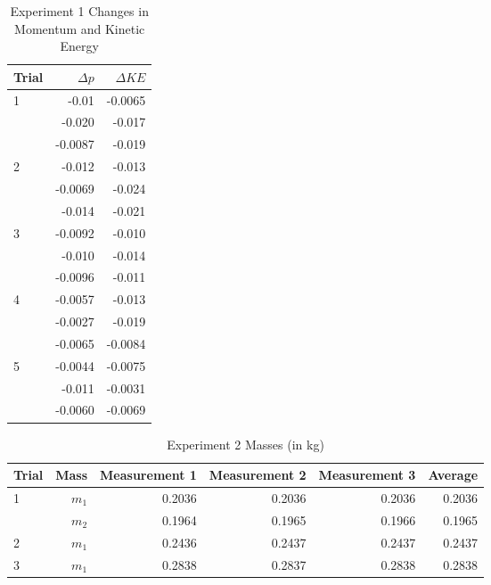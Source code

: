 \documentclass [12pt, letterpaper, twoside] {article}
\begin{document}
\begin {table}[h]
  \centering
  \begin {tabular} {| l | r | r |}
    \hline\hline
    Trial & \(\Delta{p}\) & \(\Delta{KE}\) \\
    \hline
    \multirow {3}{*}{1} & -0.01 & -0.0065 \\ %
    & -0.020 & -0.017 \\ %
    & -0.0087 & -0.019 \\ %
    \hline
    \multirow {3}{*}{2} & -0.012 & -0.013 \\ %
    & -0.0069 & -0.024 \\ %
    & -0.014 & -0.021 \\ %
    \hline
    \multirow {3}{*}{3} & -0.0092 & -0.010 \\ %
    & -0.010 & -0.014 \\ %
    & -0.0096 & -0.011 \\ %
    \hline
    \multirow {3}{*}{4} & -0.0057 & -0.013 \\ %
    & -0.0027 & -0.019 \\ %
    & -0.0065 & -0.0084 \\ %
    \hline
    \multirow {3}{*}{5} & -0.0044 & -0.0075 \\ %
    & -0.011 & -0.0031 \\ %
    & -0.0060 & -0.0069 \\ %
    \hline\hline
  \end {tabular}
  \caption {Experiment 1 Changes in Momentum and Kinetic Energy}
\end {table}

\begin {table}[h]
  \centering
  \begin {tabular} {| l | r | r | r | r | r |}
    \hline\hline
    Trial & Mass & Measurement 1 & Measurement 2 & Measurement 3 & Average \\
    \hline
    \multirow {2}{*}{1} & \(m_{1}\) & 0.2036 & 0.2036 & 0.2036 & 0.2036 \\
    & \(m_{2}\) & 0.1964 & 0.1965 & 0.1966 & 0.1965 \\
    \hline
    2 & \(m_{1}\) & 0.2436 & 0.2437 & 0.2437 & 0.2437 \\ %
    \hline
    3 & \(m_{1}\) & 0.2838 & 0.2837 & 0.2838 & 0.2838 \\ %
    \hline\hline
  \end {tabular}
  \caption {Experiment 2 Masses (in kg)}
\end {table}
\end{document}
